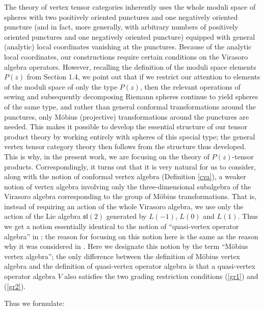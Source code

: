 \documentclass[12pt]{article}
\begin{document}
\begin{rema}\label{motivate-Mobius}{\rm
The theory of vertex tensor categories inherently uses the whole
moduli space of spheres with two positively oriented punctures and one
negatively oriented puncture (and in fact, more generally, with
arbitrary numbers of positively oriented punctures and one negatively
oriented puncture) equipped with general (analytic) local coordinates
vanishing at the punctures.  Because of the analytic local
coordinates, our constructions require certain conditions on the
Virasoro algebra operators.  However, recalling the definition of the moduli
space elements $P(z)$ {}from Section 1.4, we point out that if we
restrict our attention to elements of the moduli space of only the
type $P(z)$, then the relevant operations of sewing and subsequently
decomposing Riemann spheres continue to yield spheres of the same
type, and rather than general conformal transformations around the
punctures, only M\"obius (projective) transformations around the
punctures are needed.  This makes it possible to develop the essential
structure of our tensor product theory by working entirely with
spheres of this special type; the general vertex tensor category
theory then follows {}from the structure thus developed.  This is why,
in the present work, we are focusing on the theory of $P(z)$-tensor
products.  Correspondingly, it turns out that it is very natural for
us to consider, along with the notion of conformal vertex algebra
(Definition \ref{cva}), a weaker notion of vertex algebra
involving only the three-dimensional subalgebra of the Virasoro
algebra corresponding to the group of M\"obius transformations.  That
is, instead of requiring an action of the whole Virasoro algebra, we
use only the action of the Lie algebra ${\mathfrak s}{\mathfrak l}(2)$
generated by $L(-1)$, $L(0)$ and $L(1)$.  Thus we get a notion
essentially identical to the notion of ``quasi-vertex operator
algebra'' in \cite{FHL}; the reason for focusing on this notion here
is the same as the reason why it was considered in \cite{FHL}.  Here
we designate this notion by the term ``M\"obius vertex algebra''; the
only difference between the definition of M\"obius vertex algebra and
the definition of quasi-vertex operator algebra \cite{FHL} is that a
quasi-vertex operator algebra $V$ also satisfies the two grading
restriction conditions (\ref{gr1}) and (\ref{gr2}).}
\end{rema}

Thus we formulate:
\end{document}
